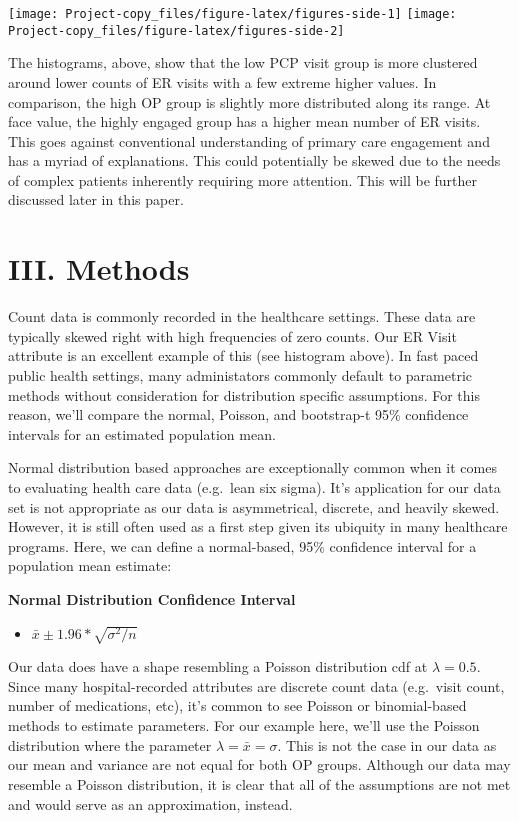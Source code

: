 \documentclass[
]{article}
\providecommand{\tightlist}{%
  \setlength{\itemsep}{0pt}\setlength{\parskip}{0pt}}
\begin{document}
\texttt{[image: Project-copy\_files/figure-latex/figures-side-1]}
\texttt{[image: Project-copy\_files/figure-latex/figures-side-2]}

The histograms, above, show that the low PCP visit group is more
clustered around lower counts of ER visits with a few extreme higher
values. In comparison, the high OP group is slightly more distributed
along its range. At face value, the highly engaged group has a higher
mean number of ER visits. This goes against conventional understanding
of primary care engagement and has a myriad of explanations. This could
potentially be skewed due to the needs of complex patients inherently
requiring more attention. This will be further discussed later in this
paper.

\section{III. Methods}\label{iii.-methods}

Count data is commonly recorded in the healthcare settings. These data
are typically skewed right with high frequencies of zero counts. Our ER
Visit attribute is an excellent example of this (see histogram above).
In fast paced public health settings, many administators commonly
default to parametric methods without consideration for distribution
specific assumptions. For this reason, we'll compare the normal,
Poisson, and bootstrap-t 95\% confidence intervals for an estimated
population mean.

Normal distribution based approaches are exceptionally common when it
comes to evaluating health care data (e.g.~lean six sigma). It's
application for our data set is not appropriate as our data is
asymmetrical, discrete, and heavily skewed. However, it is still often
used as a first step given its ubiquity in many healthcare programs.
Here, we can define a normal-based, 95\% confidence interval for a
population mean estimate:

\textbf{Normal Distribution Confidence Interval}

\begin{itemize}
\tightlist
\item
  \(\bar{x} \pm 1.96 * \sqrt{\sigma^2/n}\)
\end{itemize}

Our data does have a shape resembling a Poisson distribution cdf at
\(\lambda = 0.5\). Since many hospital-recorded attributes are discrete
count data (e.g.~visit count, number of medications, etc), it's common
to see Poisson or binomial-based methods to estimate parameters. For our
example here, we'll use the Poisson distribution where the parameter
\(\hat{\lambda} = \bar{x} = \sigma\). This is not the case in our data
as our mean and variance are not equal for both OP groups. Although our
data may resemble a Poisson distribution, it is clear that all of the
assumptions are not met and would serve as an approximation, instead.
\end{document}
